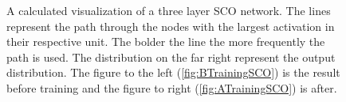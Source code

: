 \begin{figure}[H]
    \caption[A calculated visualization of the activation of a three layer \acs{SCO} network, after training and displaying the
    signal and background separately.]{A calculated visualization of a three layer \acs{SCO} network. The lines represent the path 
    through the nodes with the largest activation in their respective unit. The bolder the line the more frequently the path is used. 
    The distribution on the far right represent the output distribution.
    The figure to the left (\ref{fig:BTrainingSCO}) is the result before training and the figure to right (\ref{fig:ATrainingSCO})
    is after.} 
    \label{fig:NetDistSCO}
\end{figure}
